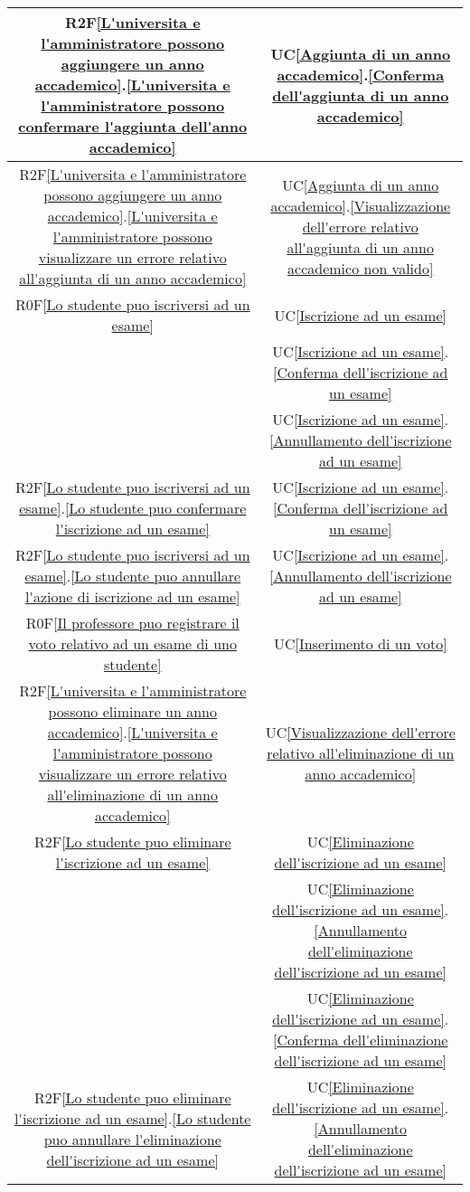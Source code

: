 \begin{longtable}{|c|c|}
\hline
R2F\ref{L'universita e l'amministratore possono aggiungere un anno accademico}.\ref{L'universita e l'amministratore possono confermare l'aggiunta dell'anno accademico} & UC\ref{Aggiunta di un anno accademico}.\ref{Conferma dell'aggiunta di un anno accademico}\\
\hline
R2F\ref{L'universita e l'amministratore possono aggiungere un anno accademico}.\ref{L'universita e l'amministratore possono visualizzare un errore relativo all'aggiunta di un anno accademico} & UC\ref{Aggiunta di un anno accademico}.\ref{Visualizzazione dell'errore relativo all'aggiunta di un anno accademico non valido}\\
\hline
R0F\ref{Lo studente puo iscriversi ad un esame} & UC\ref{Iscrizione ad un esame}\\
& UC\ref{Iscrizione ad un esame}.\ref{Conferma dell'iscrizione ad un esame}\\
& UC\ref{Iscrizione ad un esame}.\ref{Annullamento dell'iscrizione ad un esame}\\
\hline
R2F\ref{Lo studente puo iscriversi ad un esame}.\ref{Lo studente puo confermare l'iscrizione ad un esame} & UC\ref{Iscrizione ad un esame}.\ref{Conferma dell'iscrizione ad un esame}\\
\hline
R2F\ref{Lo studente puo iscriversi ad un esame}.\ref{Lo studente puo annullare l'azione di iscrizione ad un esame} & UC\ref{Iscrizione ad un esame}.\ref{Annullamento dell'iscrizione ad un esame}\\
\hline
R0F\ref{Il professore puo registrare il voto relativo ad un esame di uno studente} & UC\ref{Inserimento di un voto}\\
\hline
R2F\ref{L'universita e l'amministratore possono eliminare un anno accademico}.\ref{L'universita e l'amministratore possono visualizzare un errore relativo all'eliminazione di un anno accademico} & UC\ref{Visualizzazione dell'errore relativo all'eliminazione di un anno accademico}\\
\hline
R2F\ref{Lo studente puo eliminare l'iscrizione ad un esame} & UC\ref{Eliminazione dell'iscrizione ad un esame}\\
& UC\ref{Eliminazione dell'iscrizione ad un esame}.\ref{Annullamento dell'eliminazione dell'iscrizione ad un esame}\\
& UC\ref{Eliminazione dell'iscrizione ad un esame}.\ref{Conferma dell'eliminazione dell'iscrizione ad un esame}\\
\hline
R2F\ref{Lo studente puo eliminare l'iscrizione ad un esame}.\ref{Lo studente puo annullare l'eliminazione dell'iscrizione ad un esame} & UC\ref{Eliminazione dell'iscrizione ad un esame}.\ref{Annullamento dell'eliminazione dell'iscrizione ad un esame}\\

\end{longtable}

